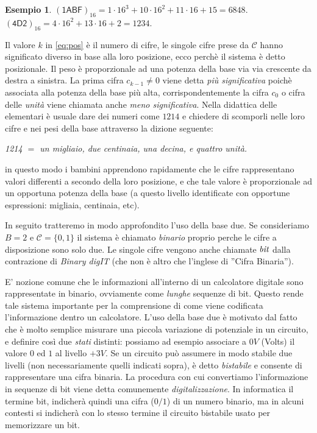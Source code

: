 \documentclass[a4paper]{book}
\theoremstyle{definition}
\newtheorem{ex}{Esempio}
\newcommand{\nota}[1]{\marginpar[{\raggedleft\small\sffamily #1\\}]{%
 								 {\raggedright\small\sffamily #1\\}}}
\begin{document}
\begin{ex} $(\textsf{1ABF})_{16} = 1\cdot 16^3 + 10\cdot 16^2 + 11 \cdot 16 +
15 = 6848$. $(\textsf{4D2})_{16} = 4\cdot 16^2 + 13\cdot 16 + 2 = 1234$.
\end{ex}

Il valore $k$ in \eqref{eq:pos} è il numero di cifre, le singole cifre prese da
$\mathcal{C}$ hanno significato diverso in base alla loro posizione, ecco
perchè il sistema è detto posizionale. Il peso è proporzionale ad una potenza
della base via via crescente da destra a sinistra. La prima cifra $c_{k-1} \neq
0$ viene detta \emph{più significativa} poichè associata alla potenza della
base più alta, corrispondentemente la cifra $c_0$ o cifra delle \emph{unità}
viene chiamata anche \emph{meno significativa}. Nella didattica delle
elementari è usuale dare dei numeri come $1214$ e chiedere di scomporli nelle
loro cifre e nei pesi della base attraverso la dizione seguente:

{\it 1214 $ = $ un migliaio, due centinaia, una decina, e quattro unità.}

\noindent in questo modo i bambini apprendono rapidamente che le cifre
rappresentano valori differenti a secondo della loro posizione, e che tale
valore è proporzionale ad un opportuna potenza della base (a questo livello
identificate con opportune espressioni: migliaia, centinaia, etc).

In seguito tratteremo in modo approfondito l'uso della base due\nota{Sistema
Binario}. Se consideriamo $B = 2$ e $\mathcal{C} = \{ 0, 1 \}$ il sistema è
chiamato \emph{binario} proprio perche le cifre a disposizione sono solo due.
Le singole cifre vengono anche chiamate $\emph{bit}$ dalla contrazione di
\emph{Binary digIT}\nota{Bit} (che non è altro che l'inglese di ''Cifra
Binaria'').

E' nozione comune che le informazioni all'interno di un calcolatore digitale
sono rappresentate in binario, ovviamente come \emph{lunghe} sequenze di bit.
Questo rende tale sistema importante per la comprensione di come viene
codificata l'informazione dentro un calcolatore. L'uso della base due è
motivato dal fatto che è molto semplice misurare una piccola variazione di
potenziale in un circuito, e definire così due \emph{stati} distinti: possiamo
ad esempio associare a $0V$ (Volts) il valore $0$ ed $1$ al livello $+3V$. Se
un circuito può assumere in modo stabile due livelli (non necessariamente
quelli indicati sopra), è detto \emph{bistabile} e consente di rappresentare
una cifra binaria. La procedura con cui convertiamo l'informazione in sequenze
di bit viene detta comunemente \emph{digitalizzazione}. In informatica il
termine bit, indicherà quindi una cifra ($0/1$) di un numero binario, ma in
alcuni contesti si indicherà con lo stesso termine il circuito bistabile usato
per memorizzare un bit.
\end{document}
